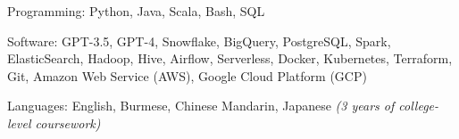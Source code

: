 

\begin{cvskills}

  \cvskill
  {Programming:} %
  {Python, Java, Scala, Bash, SQL}

  \cvskill
  {Software:} %
  {GPT-3.5, GPT-4, Snowflake, BigQuery, PostgreSQL, Spark, ElasticSearch, Hadoop, Hive, Airflow, Serverless, Docker, Kubernetes, Terraform, Git, Amazon Web Service (AWS), Google Cloud Platform (GCP)} %

  \cvskill
  {Languages:} %
  {English, Burmese, Chinese Mandarin, Japanese \bodyfontlight\emph{(3 years of college-level coursework)}} %

\end{cvskills}
